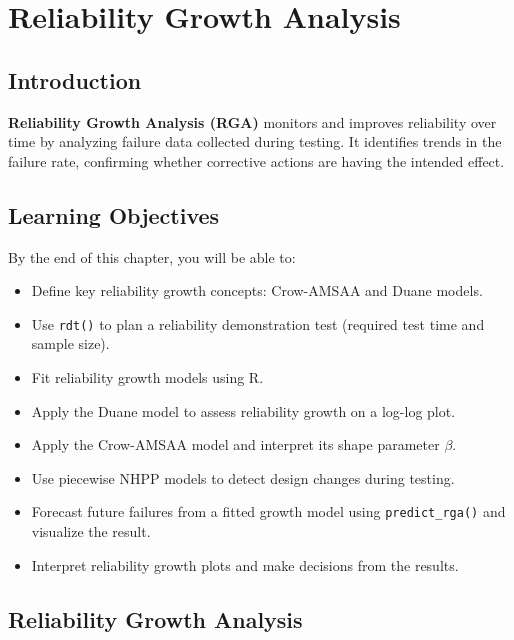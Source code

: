 \documentclass[
  letterpaper,
  DIV=11,
  numbers=noendperiod]{scrreprt}
\providecommand{\tightlist}{%
  \setlength{\itemsep}{0pt}\setlength{\parskip}{0pt}}
\begin{document}

\chapter{Reliability Growth Analysis}\label{sec-rt}

\section{Introduction}\label{introduction-3}

\textbf{Reliability Growth Analysis (RGA)} monitors and improves
reliability over time by analyzing failure data collected during
testing. It identifies trends in the failure rate, confirming whether
corrective actions are having the intended effect.

\section{Learning Objectives}\label{learning-objectives-3}

By the end of this chapter, you will be able to:

\begin{itemize}
\tightlist
\item
  Define key reliability growth concepts: Crow-AMSAA and Duane models.
\item
  Use \texttt{rdt()} to plan a reliability demonstration test (required
  test time and sample size).
\item
  Fit reliability growth models using R.
\item
  Apply the Duane model to assess reliability growth on a log-log plot.
\item
  Apply the Crow-AMSAA model and interpret its shape parameter
  \(\beta\).
\item
  Use piecewise NHPP models to detect design changes during testing.
\item
  Forecast future failures from a fitted growth model using
  \texttt{predict\_rga()} and visualize the result.
\item
  Interpret reliability growth plots and make decisions from the
  results.
\end{itemize}

\section{Reliability Growth Analysis}\label{reliability-growth-analysis}
\end{document}
